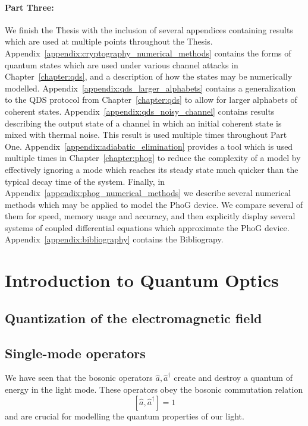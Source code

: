 \paragraph{Part Three:} We finish the Thesis with the inclusion of several appendices containing results which are used at multiple points throughout the Thesis. Appendix~\ref{appendix:cryptography_numerical_methods} contains the forms of quantum states which are used under various channel attacks in Chapter~\ref{chapter:qds}, and a description of how the states may be numerically modelled. Appendix~\ref{appendix:qds_larger_alphabets} contains a generalization to the QDS protocol from Chapter~\ref{chapter:qds} to allow for larger alphabets of coherent states. Appendix~\ref{appendix:qds_noisy_channel} contains results describing the output state of a channel in which an initial coherent state is mixed with thermal noise. This result is used multiple times throughout Part One. Appendix~\ref{appendix:adiabatic_elimination} provides a tool which is used multiple times in Chapter~\ref{chapter:phog} to reduce the complexity of a model by effectively ignoring a mode which reaches its steady state much quicker than the typical decay time of the system. Finally, in Appendix~\ref{appendix:phog_numerical_methods} we describe several numerical methods which may be applied to model the PhoG device. We compare several of them for speed, memory usage and accuracy, and then explicitly display several systems of coupled differential equations which approximate the PhoG device. Appendix~\ref{appendix:bibliography} contains the Bibliograpy.

\section{Introduction to Quantum Optics}


\FloatBarrier
\subsection{Quantization of the electromagnetic field}


\FloatBarrier
\subsection{Single-mode operators}
We have seen that the bosonic operators $\hat{a}, \hat{a}^\dagger$ create and destroy a quantum of energy in the light mode. These operators obey the bosonic commutation relation
\begin{equation}
\left[ \hat{a}, \hat{a}^\dagger \right] = 1
\end{equation}
and are crucial for modelling the quantum properties of our light. 

